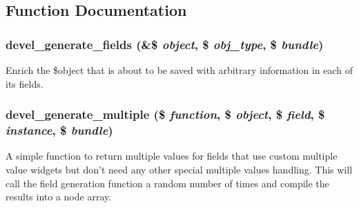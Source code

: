 \subsection{Function Documentation}
\hypertarget{devel__generate_8fields_8inc_ac5b4458ddf3e6b773f24ea286bd67af2}{
\subsubsection[{devel\_\-generate\_\-fields}]{\setlength{\rightskip}{0pt plus 5cm}devel\_\-generate\_\-fields (\&\$ {\em object}, \/  \$ {\em obj\_\-type}, \/  \$ {\em bundle})}}
\label{devel__generate_8fields_8inc_ac5b4458ddf3e6b773f24ea286bd67af2}
Enrich the \$object that is about to be saved with arbitrary information in each of its fields. \hypertarget{devel__generate_8fields_8inc_ad2eb6952df779dbc62e145d7cc2f86c0}{
\subsubsection[{devel\_\-generate\_\-multiple}]{\setlength{\rightskip}{0pt plus 5cm}devel\_\-generate\_\-multiple (\$ {\em function}, \/  \$ {\em object}, \/  \$ {\em field}, \/  \$ {\em instance}, \/  \$ {\em bundle})}}
\label{devel__generate_8fields_8inc_ad2eb6952df779dbc62e145d7cc2f86c0}
A simple function to return multiple values for fields that use custom multiple value widgets but don't need any other special multiple values handling. This will call the field generation function a random number of times and compile the results into a node array. 